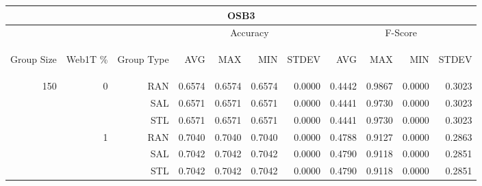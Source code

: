 \begin{center}
\begin{table}[htbp] 
 \begin{center}
\begin{tabular}{ | r | r | r | r | r | r | r | r | r | r | r |}
\hline
\multicolumn{11}{|c|}{OSB3}\\
\hline
 & & & \multicolumn{4}{|c|}{Accuracy} & \multicolumn{4}{|c|}{F-Score}\\ \cline{4-11}
\begin{sideways}Group Size\end{sideways} & \begin{sideways}Web1T \%\end{sideways} & \begin{sideways}Group Type\end{sideways} & \begin{sideways}AVG\end{sideways} & \begin{sideways}MAX\end{sideways} & \begin{sideways}MIN\end{sideways} & \begin{sideways}STDEV\end{sideways} & \begin{sideways}AVG\end{sideways} & \begin{sideways}MAX\end{sideways} & \begin{sideways}MIN\end{sideways} & \begin{sideways}STDEV\end{sideways}\\
\hline
\multirow{18}{*}{150}
 & \multirow{3}{*}{0} & RAN & 0.6574 & 0.6574 & 0.6574 & 0.0000 & 0.4442 & 0.9867 & 0.0000 & 0.3023\\ \cline{3-11}
 &   & SAL & 0.6571 & 0.6571 & 0.6571 & 0.0000 & 0.4441 & 0.9730 & 0.0000 & 0.3023\\ \cline{3-11}
 &   & STL & 0.6571 & 0.6571 & 0.6571 & 0.0000 & 0.4441 & 0.9730 & 0.0000 & 0.3023\\ \cline{2-11}
 & \multirow{3}{*}{1} & RAN & 0.7040 & 0.7040 & 0.7040 & 0.0000 & 0.4788 & 0.9127 & 0.0000 & 0.2863\\ \cline{3-11}
 &   & SAL & 0.7042 & 0.7042 & 0.7042 & 0.0000 & 0.4790 & 0.9118 & 0.0000 & 0.2851\\ \cline{3-11}
 &   & STL & 0.7042 & 0.7042 & 0.7042 & 0.0000 & 0.4790 & 0.9118 & 0.0000 & 0.2851\\ \cline{2-11}

\end{tabular}
\end{center}
\end{table}
\end{center}
